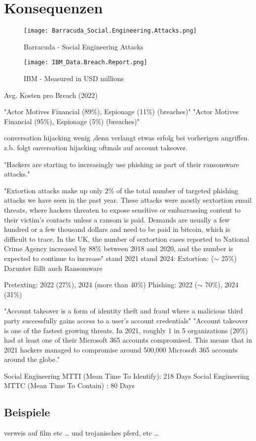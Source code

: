 \chapter{Konsequenzen}

\begin{figure}[H]
    \centering
    \texttt{[image: Barracuda\_Social.Engineering.Attacks.png]}
    \caption{Barracuda - Social Engineering Attacks}
\end{figure}

\begin{figure}[H]
    \centering
    \texttt{[image: IBM\_Data.Breach.Report.png]}
    \caption{IBM - Measured in USD millions}
\end{figure}
Avg. Kosten pro Breach (2022)

\newpage

"Actor Motives Financial (89\%), Espionage (11\%) (breaches)"\cite{9_verizon}
"Actor Motives Financial (95\%), Espionage (5\%) (breaches)"\cite{8_verizon}

conversation hijacking wenig ,denn verlangt etwas erfolg bei vorherigen angriffen.
z.b. folgt onversation hijacking oftmals auf account takeover.

"Hackers are starting to increasingly use phishing as part of their
ransomware attacks."\cite{3_barracuda}

"Extortion attacks make up only 2\% of the total number of
targeted phishing attacks we have seen in the past year. These
attacks were mostly sextortion email threats, where hackers
threaten to expose sensitive or embarrassing content to their
victim’s contacts unless a ransom is paid. Demands are usually
a few hundred or a few thousand dollars and need to be paid
in bitcoin, which is difficult to trace. In the UK, the number of
sextortion cases reported to National Crime Agency increased
by 88\% between 2018 and 2020, and the number is expected to
continue to increase"\cite{3_barracuda} stand 2021
stand 2024: Extortion: ($\sim$ 25\%) \cite{8_verizon}
Darunter fällt auch Ransomware

Pretexting: 2022 (27\%), 2024 (more than 40\%)
Phishing: 2022 ($\sim$ 70\%), 2024 (31\%)\cite{8_verizon,9_verizon}

"Account takeover is a form of identity theft and fraud where a
malicious third party successfully gains access to a user’s account
credentials"\cite{3_barracuda}
"Account takeover is one of the fastest growing threats. In 2021,
roughly 1 in 5 organizations (20\%) had at least one of their
Microsoft 365 accounts compromised. This means that in 2021
hackers managed to compromise around 500,000 Microsoft 365
accounts around the globe."\cite{3_barracuda}

Social Engineering MTTI (Mean Time To Identify): 218 Days
Social Engineering MTTC (Mean Time To Contain) :  80 Days\cite{6_ibmsecurity}


\section{Beispiele}

verweis auf film etc \dots
und trojanisches pferd, etc \dots
